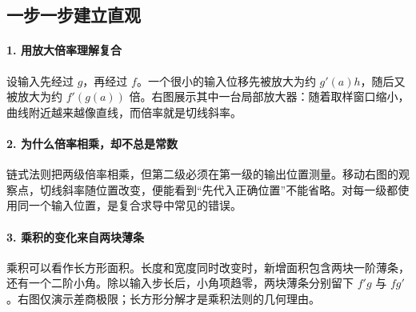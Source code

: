\subsection*{一步一步建立直观}

\paragraph{1. 用放大倍率理解复合}

设输入先经过 $g$，再经过 $f$。一个很小的输入位移先被放大为约 $g'(a)h$，随后又被放大为约 $f'(g(a))$ 倍。右图展示其中一台局部放大器：随着取样窗口缩小，曲线附近越来越像直线，而倍率就是切线斜率。



\paragraph{2. 为什么倍率相乘，却不总是常数}

链式法则把两级倍率相乘，但第二级必须在第一级的输出位置测量。移动右图的观察点，切线斜率随位置改变，便能看到“先代入正确位置”不能省略。对每一级都使用同一个输入位置，是复合求导中常见的错误。



\paragraph{3. 乘积的变化来自两块薄条}

乘积可以看作长方形面积。长度和宽度同时改变时，新增面积包含两块一阶薄条，还有一个二阶小角。除以输入步长后，小角项趋零，两块薄条分别留下 $f'g$ 与 $fg'$。右图仅演示差商极限；长方形分解才是乘积法则的几何理由。
